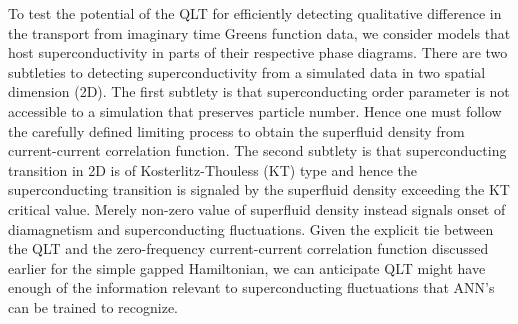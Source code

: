\documentclass[amsmath,amssymb, aps, prx, longbibliography, twocolumn]{revtex4-1}
\begin{document}
%
To test the potential of the QLT for efficiently detecting qualitative difference in the transport from imaginary time Greens function data, we consider models that host superconductivity in parts of their respective phase diagrams.
There are two subtleties to detecting superconductivity from a simulated data in two spatial dimension (2D). The first subtlety is that superconducting order parameter is not accessible to a simulation that preserves particle number. Hence one must follow the carefully defined limiting process to obtain the superfluid density from current-current correlation function\cite{Scalapino1993, Scalapino1992}. The second subtlety is that superconducting transition in 2D is of Kosterlitz-Thouless (KT) type and hence the superconducting transition is signaled by the superfluid density exceeding the KT critical value\cite{KT1973}. Merely non-zero value of superfluid density instead signals onset of diamagnetism and superconducting fluctuations. Given the explicit tie between the QLT and the zero-frequency current-current correlation function discussed earlier for the simple gapped Hamiltonian, we can anticipate QLT might have enough of the information relevant to superconducting fluctuations that ANN's can be trained to recognize.  

\end{document}
